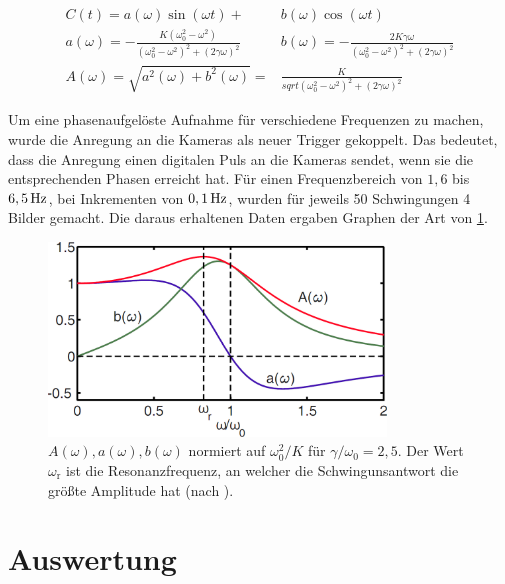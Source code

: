 \documentclass[numbers=noenddot,a4paper]{scrartcl}
\newcommand{\ix}[1]{_\text{#1}}
\begin{document}
				\begin{align}
					C\left(t\right)=a\left(\omega\right)\sin\left(\omega t\right)+&b\left(\omega\right)\cos\left(\omega t\right) \label{eq:gedämpft} \\
					a\left(\omega\right)=-\frac{K\left(\omega\ix{0}^2-\omega^2\right)}{\left(\omega\ix{0}^2-\omega^2\right)^2+\left(2\gamma\omega\right)^2} \quad& b\left(\omega\right)=-\frac{2K\gamma\omega}{\left(\omega\ix{0}^2-\omega^2\right)^2+\left(2\gamma\omega\right)^2} \\
					A\left(\omega\right)=\sqrt{a^2\left(\omega\right)+b^2\left(\omega\right)}=&\frac{K}{sqrt{\left(\omega\ix{0}^2-\omega^2\right)^2+\left(2\gamma\omega\right)^2}} \label{eq:amplitud}
				\end{align}

			Um eine phasenaufgelöste Aufnahme für verschiedene Frequenzen zu machen, wurde die Anregung an die Kameras als neuer Trigger gekoppelt. Das bedeutet, dass die Anregung einen digitalen Puls an die Kameras sendet, wenn sie die entsprechenden Phasen erreicht hat. Für einen Frequenzbereich von $1,6$ bis $\unit[6,5]{Hz}$, bei Inkrementen von $\unit[0,1]{Hz}$, wurden für jeweils 50 Schwingungen 4 Bilder gemacht. Die daraus erhaltenen Daten ergaben Graphen der Art von \ref{img:amplitud}.

				\begin{figure}[H]
					\centering
					\includegraphics[width=0.8\textwidth,height=0.4\textwidth]{figs/amplitud.png}
					\caption{$A\left(\omega\right), a\left(\omega\right), b\left(\omega\right)$ normiert auf $\omega\ix{0}^2/K $ für $\gamma/\omega\ix{0}=2,5$. Der Wert $\omega\ix{r}$ ist die Resonanzfrequenz, an welcher die Schwingunsantwort die größte Amplitude hat (nach \cite{Carstensen11}).}
					\label{img:amplitud}
				\end{figure}

	\newpage

	\section{Auswertung}\label{sec:auswert}
\end{document}
